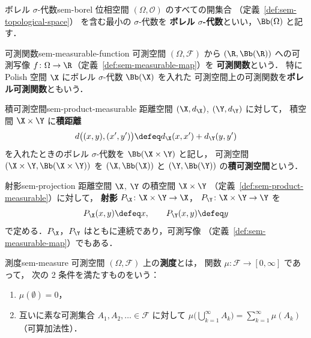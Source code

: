 \begin{definition}{ボレル $\sigma$-代数}{sem-borel}
  位相空間 $(\Omega, \mathcal{O})$ のすべての開集合
  （定義~\ref{def:sem-topological-space}）
  を含む最小の $\sigma$-代数を
  \textbf{ボレル $\sigma$-代数}といい，$\Bb(\Omega)$ と記す．
\end{definition}

\begin{definition}{可測関数}{sem-measurable-function}
  可測空間 $(\Omega, \mathcal{F})$ から $(\R, \Bb(\R))$ への可測写像
  $f \colon \Omega \to \R$（定義~\ref{def:sem-measurable-map}）を
  \textbf{可測関数}という．
  特に Polish 空間 $\X$ にボレル $\sigma$-代数 $\Bb(\X)$ を入れた
  可測空間上の可測関数を\textbf{ボレル可測関数}ともいう．
\end{definition}

\begin{definition}{積可測空間}{sem-product-measurable}
  距離空間 $(\X, d_\X)$, $(\Y, d_\Y)$ に対して，
  積空間 $\X \times \Y$ に\textbf{積距離}
  \[
    d\bigl((x, y), (x', y')\bigr) \defeq d_\X(x, x') + d_\Y(y, y')
  \]
  を入れたときのボレル $\sigma$-代数を $\Bb(\X \times \Y)$ と記し，
  可測空間 $(\X \times \Y, \Bb(\X \times \Y))$ を
  $(\X, \Bb(\X))$ と $(\Y, \Bb(\Y))$ の\textbf{積可測空間}という．
\end{definition}

\begin{definition}{射影}{sem-projection}
  距離空間 $\X$, $\Y$ の積空間 $\X \times \Y$
  （定義~\ref{def:sem-product-measurable}）に対して，
  \textbf{射影} $P_\X \colon \X \times \Y \to \X$，
  $P_\Y \colon \X \times \Y \to \Y$ を
  \[
    P_\X(x, y) \defeq x,
    \qquad
    P_\Y(x, y) \defeq y
  \]
  で定める．$P_\X$，$P_\Y$ はともに連続であり，可測写像
  （定義~\ref{def:sem-measurable-map}）でもある．
\end{definition}

\begin{definition}{測度}{sem-measure}
  可測空間 $(\Omega, \mathcal{F})$ 上の\textbf{測度}とは，
  関数 $\mu \colon \mathcal{F} \to [0, \infty]$ であって，
  次の 2 条件を満たすものをいう：
  \begin{enumerate}
    \item[(i)] $\mu(\emptyset) = 0$，
    \item[(ii)] 互いに素な可測集合 $A_1, A_2, \ldots \in \mathcal{F}$ に対して
      $\mu\bigl(\bigcup_{k=1}^{\infty} A_k\bigr) = \sum_{k=1}^{\infty} \mu(A_k)$
      （可算加法性）．
  \end{enumerate}
\end{definition}

